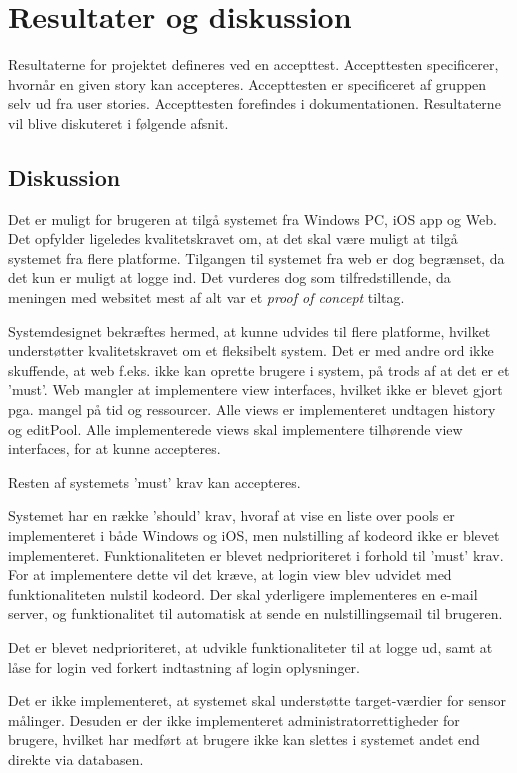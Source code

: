 \chapter{Resultater og diskussion}
Resultaterne for projektet defineres ved en accepttest. Accepttesten specificerer, hvornår en given story kan accepteres. Accepttesten er specificeret af gruppen selv ud fra user stories. Accepttesten forefindes i dokumentationen. Resultaterne vil blive diskuteret i følgende afsnit.

\section{Diskussion}
Det er muligt for brugeren at tilgå systemet fra Windows PC, iOS app og Web. Det opfylder ligeledes kvalitetskravet om, at det skal være muligt at tilgå systemet fra flere platforme. Tilgangen til systemet fra web er dog begrænset, da det kun er muligt at logge ind. Det vurderes dog som tilfredstillende, da meningen med websitet mest af alt var et \textit{proof of concept} tiltag. 

Systemdesignet bekræftes hermed, at kunne udvides til flere platforme, hvilket understøtter kvalitetskravet om et fleksibelt system. Det er med andre ord ikke skuffende, at web f.eks. ikke kan oprette brugere i system, på trods af at det er et 'must'. Web mangler at implementere view interfaces, hvilket ikke er blevet gjort pga. mangel på tid og ressourcer. Alle views er implementeret undtagen history og editPool. Alle implementerede views skal implementere tilhørende view interfaces, for at kunne accepteres. 

Resten af systemets 'must' krav kan accepteres.

Systemet har en række 'should' krav, hvoraf at vise en liste over pools er implementeret i både Windows og iOS, men nulstilling af kodeord ikke er blevet implementeret. Funktionaliteten er blevet nedprioriteret i forhold til 'must' krav. For at implementere dette vil det kræve, at login view blev udvidet med funktionaliteten nulstil kodeord. Der skal yderligere implementeres en e-mail server, og funktionalitet til automatisk at sende en nulstillingsemail til brugeren.

Det er blevet nedprioriteret, at udvikle funktionaliteter til at logge ud, samt at låse for login ved forkert indtastning af login oplysninger. 

Det er ikke implementeret, at systemet skal understøtte target-værdier for sensor målinger. Desuden er der ikke implementeret administratorrettigheder for brugere, hvilket har medført at brugere ikke kan slettes i systemet andet end direkte via databasen.

